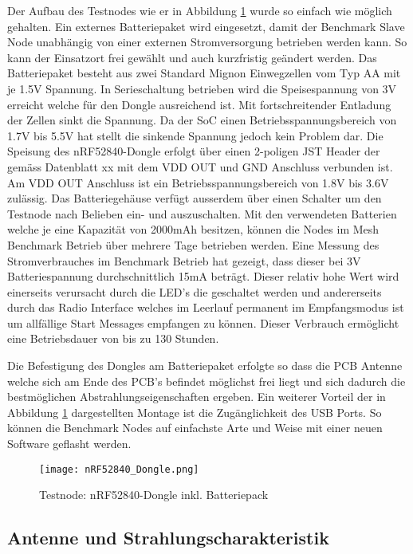 Der Aufbau des Testnodes wie er in Abbildung \ref{fig:TestnodenRF52840-DongleinklBatteriepack} wurde so einfach wie möglich gehalten. Ein externes Batteriepaket wird eingesetzt, damit der Benchmark Slave Node unabhängig von einer externen Stromversorgung betrieben werden kann. So kann der Einsatzort frei gewählt und auch kurzfristig geändert werden.
Das Batteriepaket besteht aus zwei Standard Mignon Einwegzellen vom Typ AA mit je 1.5V Spannung. In Serieschaltung betrieben wird die Speisespannung von 3V erreicht welche für den Dongle ausreichend ist. Mit fortschreitender Entladung der Zellen sinkt die Spannung. Da der SoC einen Betriebsspannungsbereich von 1.7V bis 5.5V hat stellt die sinkende Spannung jedoch kein Problem dar.
Die Speisung des nRF52840-Dongle erfolgt über einen 2-poligen JST Header der gemäss Datenblatt xx mit dem VDD OUT und GND Anschluss verbunden ist. Am VDD OUT Anschluss ist ein Betriebsspannungsbereich von 1.8V bis 3.6V zulässig.
Das Batteriegehäuse verfügt ausserdem über einen Schalter um den Testnode nach Belieben ein- und auszuschalten.
Mit den verwendeten Batterien welche je eine Kapazität von 2000mAh besitzen, können die Nodes im Mesh Benchmark Betrieb über mehrere Tage betrieben werden.
Eine Messung des Stromverbrauches im Benchmark Betrieb hat gezeigt, dass dieser bei 3V Batteriespannung durchschnittlich 15mA beträgt. Dieser relativ hohe Wert wird einerseits verursacht durch die LED's die geschaltet werden und andererseits durch das Radio Interface welches im Leerlauf permanent im Empfangsmodus ist um allfällige Start Messages empfangen zu können. 
Dieser Verbrauch ermöglicht eine Betriebsdauer von bis zu 130 Stunden. 

Die Befestigung des Dongles am Batteriepaket erfolgte so dass die PCB Antenne welche sich am Ende des PCB's befindet möglichst frei liegt und sich dadurch die bestmöglichen Abstrahlungseigenschaften ergeben. Ein weiterer Vorteil der in Abbildung \ref{fig:TestnodenRF52840-DongleinklBatteriepack} dargestellten Montage ist die Zugänglichkeit des USB Ports. So können die Benchmark Nodes auf einfachste Arte und Weise mit einer neuen Software geflasht werden.

 
\begin{figure} [H]
	\centering
	\texttt{[image: nRF52840\_Dongle.png]}
	\caption{Testnode: nRF52840-Dongle inkl. Batteriepack}
	\label{fig:TestnodenRF52840-DongleinklBatteriepack}
\end{figure}

\subsection{Antenne und Strahlungscharakteristik}\label{subsec:AntenneundStrahlungscharakteristik}

